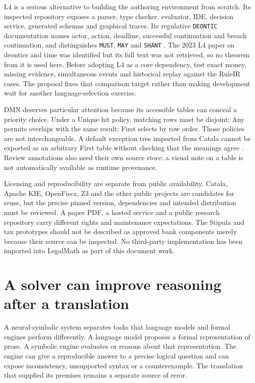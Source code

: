 \documentclass[12pt,a4paper,oneside,openany]{book}
\begin{document}
L4 is a serious alternative to building the authoring environment from scratch.
Its inspected repository exposes a parser, type checker, evaluator, IDE,
decision service, generated schemas and graphical traces. Its regulative
\texttt{DEONTIC} documentation names actor, action, deadline, successful
continuation and breach continuation, and distinguishes \texttt{MUST},
\texttt{MAY} and \texttt{SHANT} \citep{l4code}. The 2023 L4 paper on deontics
and time was identified but its full text was not retrieved, so no theorem from
it is used here. Before adopting L4 as a core dependency, test exact money,
missing evidence, simultaneous events and historical replay against the RuleIR
cases. The proposal fixes that comparison target rather than making development
wait for another language-selection exercise.

DMN deserves particular attention because its accessible tables can conceal a
priority choice. Under a Unique hit policy, matching rows must be disjoint; Any
permits overlaps with the same result; First selects by row order. Those policies
are not interchangeable. A default exception tree imported from Catala cannot be
exported as an arbitrary First table without checking that the meanings agree
\citep[sec.~8.2.11]{dmn2024}. Review annotations also need their own source store:
a visual note on a table is not automatically available as runtime provenance.

Licensing and reproducibility are separate from public availability. Catala,
Apache KIE, OpenFisca, Z3 and the other public projects are candidates for reuse,
but the precise pinned version, dependencies and intended distribution must be
reviewed. A paper PDF, a hosted service and a public research repository carry
different rights and maintenance expectations. The Stipula and tax prototypes
should not be described as approved bank components merely because their source
can be inspected. No third-party implementation has been imported into LegalMath
as part of this document work.

\section{A solver can improve reasoning after a translation}
\label{merge:M04:10}

\label{sec:languages-neurosymbolic}
A neural-symbolic system separates tasks that language models and formal
engines perform differently. A language model proposes a formal representation
of prose. A symbolic engine evaluates or reasons about that representation.
The engine can give a reproducible answer to a precise logical question and
can expose inconsistency, unsupported syntax or a counterexample. The
translation that supplied its premises remains a separate source of error.
\end{document}
